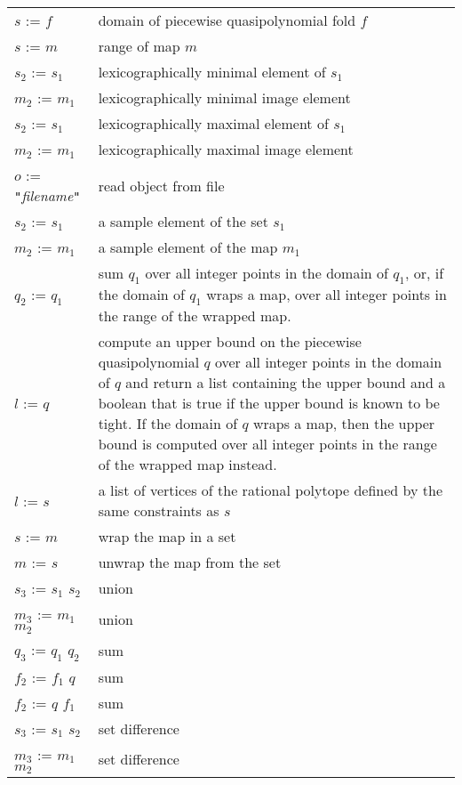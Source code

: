 \begin{supertabular}{lp{0.7\textwidth}}
\\
$s$ :=  $f$ &
domain of piecewise quasipolynomial fold $f$
\\
$s$ :=  $m$ &
range of map $m$
\\
$s_2$ :=  $s_1$ &
lexicographically minimal element of $s_1$
\\
$m_2$ :=  $m_1$ &
lexicographically minimal image element
\\
$s_2$ :=  $s_1$ &
lexicographically maximal element of $s_1$
\\
$m_2$ :=  $m_1$ &
lexicographically maximal image element
\\
$o$ :=  {\tt "}{\it filename}{\tt"} &
read object from file
\\
$s_2$ :=  $s_1$ &
a sample element of the set $s_1$
\\
$m_2$ :=  $m_1$ &
a sample element of the map $m_1$
\\
$q_2$ :=  $q_1$ &
sum $q_1$ over all integer points in the domain of $q_1$,
or, if the domain of $q_1$ wraps a map, over all integer
points in the range of the wrapped map.
\\
$l$ :=  $q$ &
compute an
upper bound on the piecewise quasipolynomial $q$ over
all integer points in the domain of $q$
and return a list containing the upper bound
and a boolean that is true if the upper bound
is known to be tight.
If the domain of $q$ wraps a map, then the upper
bound is computed over all integer points in
the range of the wrapped map instead.
\\
$l$ :=  $s$ &
a list of vertices of the rational polytope defined by the same constraints
as $s$
\\
$s$ :=  $m$ &
wrap the map in a set
\\
$m$ :=  $s$ &
unwrap the map from the set
\\
$s_3$ := $s_1$ \ai{$+$} $s_2$ & union
\\
$m_3$ := $m_1$ \ai{$+$} $m_2$ & union
\\
$q_3$ := $q_1$ \ai{$+$} $q_2$ & sum
\\
$f_2$ := $f_1$ \ai{$+$} $q$ & sum
\\
$f_2$ := $q$ \ai{$+$} $f_1$ & sum
\\
$s_3$ := $s_1$ \ai{$-$} $s_2$ & set difference
\\
$m_3$ := $m_1$ \ai{$-$} $m_2$ & set difference
\\

\end{supertabular}
